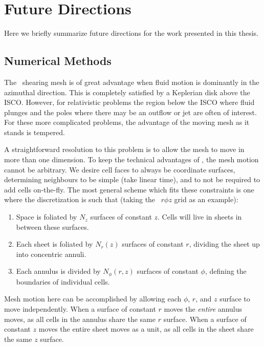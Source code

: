 \chapter*{Future Directions}



Here we briefly summarize future directions for the work presented in this thesis.

\section*{Numerical Methods}

The \disco\ shearing mesh is of great advantage when fluid motion is dominantly in the azimuthal direction.  This is completely satisfied by a Keplerian disk above the ISCO.  However, for relativistic problems the region below the ISCO where fluid plunges and the poles where there may be an outflow or jet are often of interest.  For these more complicated problems, the advantage of the moving mesh as it stands is tempered.

A straightforward resolution to this problem is to allow the mesh to move in more than one dimension.  To keep the technical advantages of \disco, the mesh motion cannot be arbitrary.  We desire cell faces to always be coordinate surfaces, determining neighbours to be simple (take linear time), and to not be required to add cells on-the-fly.  The most general scheme which fits these constraints is one where the discretization is such that (taking the \disco\ $r\phi z$ grid as an example):
\begin{enumerate}
	\item Space is foliated by $N_z$ surfaces of constant $z$.  Cells will live in sheets in between these surfaces.
	\item Each sheet is foliated by $N_r(z)$ surfaces of constant $r$, dividing the sheet up into concentric annuli.
	\item Each annulus is divided by $N_\phi(r,z)$ surfaces of constant $\phi$, defining the boundaries of individual cells.
\end{enumerate}
Mesh motion here can be accomplished by allowing each $\phi$, $r$, and $z$ surface to move independently.  When a surface of constant $r$ moves the \emph{entire} annulus moves, as all cells in the annulus share the same $r$ surface.  When a surface of constant $z$ moves the entire sheet moves as a unit, as all cells in the sheet share the same $z$ surface.


